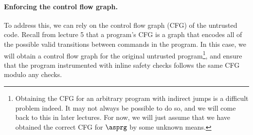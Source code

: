\documentclass[11pt,twoside]{scrartcl}
\begin{document}
\paragraph{Enforcing the control flow graph.} To address this, we can rely on the control flow graph (CFG) of the untrusted code. Recall from lecture 5 that a program's CFG is a graph that encodes all of the possible valid transitions between commands in the program. In this case, we will obtain a control flow graph for the original untrusted program\footnote{Obtaining the CFG for an arbitrary program with indirect jumps is a difficult problem indeed. It may not always be possible to do so, and we will come back to this in later lectures. For now, we will just assume that we have obtained the correct CFG for $\asprg$ by some unknown means.}, and ensure that the program instrumented with inline safety checks follows the same CFG modulo any checks.
\end{document}
